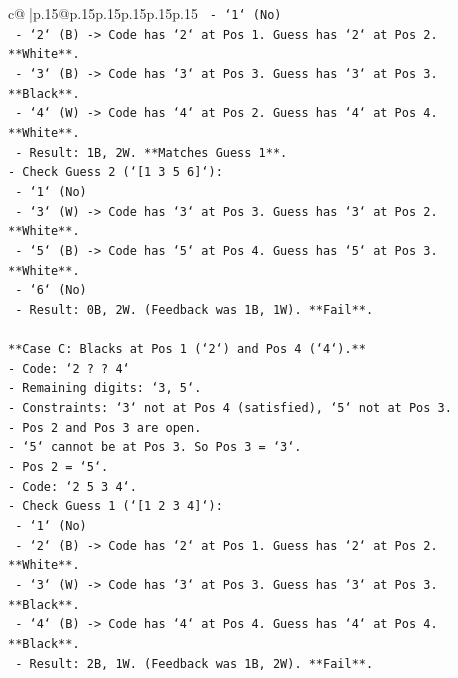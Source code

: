 \documentclass{article}
\begin{document}
{\begin{supertabular}{c@{$\;$}|p{.15\linewidth}@{}p{.15\linewidth}p{.15\linewidth}p{.15\linewidth}p{.15\linewidth}p{.15\linewidth}}
{{{\texttt{    {-}   `1` (No)} \\
\texttt{    {-}   `2` (B) {-}> Code has `2` at Pos 1. Guess has `2` at Pos 2. **White**.} \\
\texttt{    {-}   `3` (B) {-}> Code has `3` at Pos 3. Guess has `3` at Pos 3. **Black**.} \\
\texttt{    {-}   `4` (W) {-}> Code has `4` at Pos 2. Guess has `4` at Pos 4. **White**.} \\
\texttt{    {-}   Result: 1B, 2W. **Matches Guess 1**.} \\
\texttt{{-}   Check Guess 2 (`{[}1 3 5 6{]}`):} \\
\texttt{    {-}   `1` (No)} \\
\texttt{    {-}   `3` (W) {-}> Code has `3` at Pos 3. Guess has `3` at Pos 2. **White**.} \\
\texttt{    {-}   `5` (B) {-}> Code has `5` at Pos 4. Guess has `5` at Pos 3. **White**.} \\
\texttt{    {-}   `6` (No)} \\
\texttt{    {-}   Result: 0B, 2W. (Feedback was 1B, 1W). **Fail**.} \\
\\ 
\texttt{**Case C: Blacks at Pos 1 (`2`) and Pos 4 (`4`).**} \\
\texttt{{-}   Code: `2 ? ? 4`} \\
\texttt{{-}   Remaining digits: `3, 5`.} \\
\texttt{{-}   Constraints: `3` not at Pos 4 (satisfied), `5` not at Pos 3.} \\
\texttt{{-}   Pos 2 and Pos 3 are open.} \\
\texttt{{-}   `5` cannot be at Pos 3. So Pos 3 = `3`.} \\
\texttt{{-}   Pos 2 = `5`.} \\
\texttt{{-}   Code: `2 5 3 4`.} \\
\texttt{{-}   Check Guess 1 (`{[}1 2 3 4{]}`):} \\
\texttt{    {-}   `1` (No)} \\
\texttt{    {-}   `2` (B) {-}> Code has `2` at Pos 1. Guess has `2` at Pos 2. **White**.} \\
\texttt{    {-}   `3` (W) {-}> Code has `3` at Pos 3. Guess has `3` at Pos 3. **Black**.} \\
\texttt{    {-}   `4` (B) {-}> Code has `4` at Pos 4. Guess has `4` at Pos 4. **Black**.} \\
\texttt{    {-}   Result: 2B, 1W. (Feedback was 1B, 2W). **Fail**.} \\
}}}
\end{supertabular}}
\end{document}
